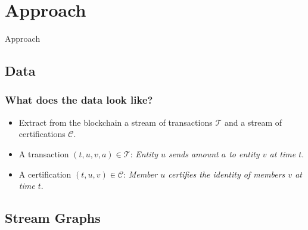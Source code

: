 \documentclass{beamer}
\begin{document}
\section{Approach}

\begin{frame}
	\Huge{\centerline{Approach}}
\end{frame}

\subsection{Data}

\begin{frame}
	\frametitle{What does the \textbf{data} look like?}
	\begin{itemize}
		\item<1-> Extract from the blockchain a stream of transactions $\mathcal{T}$ and a stream of certifications $\mathcal{C}$.
		\item<2-> A transaction $\left(t,u,v,a\right) \in \mathcal{T}$: \textit{Entity $u$ sends amount $a$ to entity $v$ at time $t$}.
		\item<3-> A certification $\left(t,u,v\right) \in \mathcal{C}$: \textit{Member $u$ certifies the identity of members $v$ at time $t$}.
	\end{itemize}
\end{frame}

\subsection{Stream Graphs}
\end{document}
